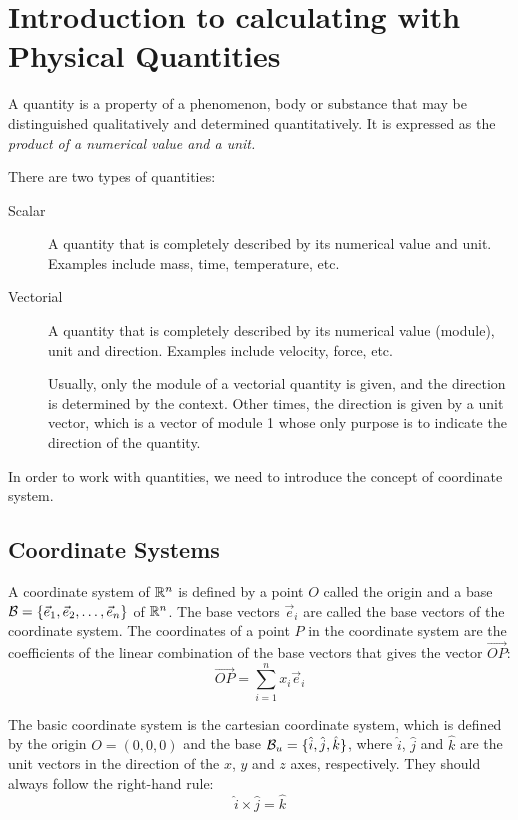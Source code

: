 \chapter{Introduction to calculating with Physical Quantities}

\begin{definicion}[Quantity]
    A quantity is a property of a phenomenon, body or substance that may be distinguished qualitatively and determined quantitatively. It is expressed as the \emph{product of a numerical value and a unit.}
\end{definicion}

There are two types of quantities:
\begin{description}
    \item[Scalar] A quantity that is completely described by its numerical value and unit. Examples include mass, time, temperature, etc.
    \item[Vectorial] A quantity that is completely described by its numerical value (module), unit and direction. Examples include velocity, force, etc.
    
    Usually, only the module of a vectorial quantity is given, and the direction is determined by the context. Other times, the direction is given by a unit vector, which is a vector of module 1 whose only purpose is to indicate the direction of the quantity.
\end{description}

In order to work with quantities, we need to introduce the concept of coordinate system.

\section{Coordinate Systems}

A coordinate system of $\mathbb{R}^n$ is defined by a point $O$ called the origin and a base $\mathcal{B}=\{\vec{e}_1, \vec{e}_2, \ldots, \vec{e}_n\}$ of $\mathbb{R}^n$. The base vectors $\vec{e}_i$ are called the base vectors of the coordinate system. The coordinates of a point $P$ in the coordinate system are the coefficients of the linear combination of the base vectors that gives the vector $\vec{OP}$:
\begin{equation*}
    \vec{OP} = \sum_{i=1}^n x_i \vec{e}_i
\end{equation*}

The basic coordinate system is the cartesian coordinate system, which is defined by the origin $O=(0,0,0)$ and the base $\mathcal{B}_u=\{\hat{i}, \hat{j}, \hat{k}\}$, where $\hat{i}$, $\hat{j}$ and $\hat{k}$ are the unit vectors in the direction of the $x$, $y$ and $z$ axes, respectively. They should always follow the right-hand rule:
\begin{equation*}
    \hat{i} \times \hat{j} = \hat{k}
\end{equation*}

